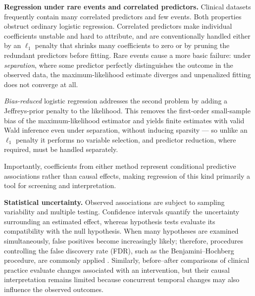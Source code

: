 \textbf{Regression under rare events and correlated predictors.}
Clinical datasets frequently contain many correlated predictors and few
events. Both properties obstruct ordinary logistic regression. Correlated
predictors make individual coefficients unstable and hard to attribute,
and are conventionally handled either by an $\ell_1$ penalty that shrinks
many coefficients to zero \citep{tibshirani1996lasso} or by pruning the
redundant predictors before fitting. Rare events cause a more basic
failure: under \emph{separation}, where some predictor perfectly
distinguishes the outcome in the observed data, the maximum-likelihood
estimate diverges and unpenalized fitting does not converge at all.

\emph{Bias-reduced} logistic regression \citep{firth1993bias} addresses
the second problem by adding a Jeffreys-prior penalty to the likelihood.
This removes the first-order small-sample bias of the maximum-likelihood
estimator and yields finite estimates with valid Wald inference even
under separation, without inducing sparsity --- so unlike an $\ell_1$
penalty it performs no variable selection, and predictor reduction, where
required, must be handled separately.

Importantly, coefficients from either method represent conditional
predictive associations rather than causal effects, making regression of
this kind primarily a tool for screening and interpretation.

\textbf{Statistical uncertainty.}
Observed associations are subject to sampling variability and multiple
testing. Confidence intervals quantify the uncertainty surrounding an
estimated effect, whereas hypothesis tests evaluate its compatibility
with the null hypothesis. When many hypotheses are examined
simultaneously, false positives become increasingly likely; therefore,
procedures controlling the false discovery rate (FDR), such as the
Benjamini--Hochberg procedure, are commonly applied
\citep{benjamini1995controlling}. Similarly, before--after comparisons of
clinical practice evaluate changes associated with an intervention, but
their causal interpretation remains limited because concurrent temporal
changes may also influence the observed outcomes.